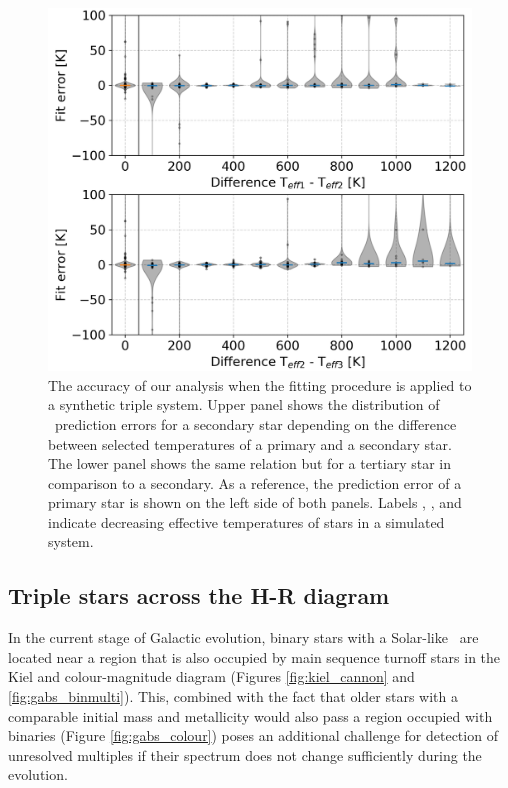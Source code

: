 \begin{figure}
	\centering
	\includegraphics[width=\columnwidth]{three_stars_fit_sim_res.png}
	\caption{The accuracy of our analysis when the fitting procedure is applied to a synthetic triple system. Upper panel shows the distribution of \Teff\ prediction errors for a secondary star depending on the difference between selected temperatures of a primary and a secondary star. The lower panel shows the same relation but for a tertiary star in comparison to a secondary. As a reference, the prediction error of a primary star is shown on the left side of both panels. Labels , , and  indicate decreasing effective temperatures of stars in a simulated system.}
	\label{fig:triple_sym_res}
\end{figure}

\subsection{Triple stars across the H-R diagram}
In the current stage of Galactic evolution, binary stars with a Solar-like \Teff\ are located near a region that is also occupied by main sequence turnoff stars in the Kiel and colour-magnitude diagram (Figures \ref{fig:kiel_cannon} and \ref{fig:gabs_binmulti}). This, combined with the fact that older stars with a comparable initial mass and metallicity would also pass a region occupied with binaries (Figure \ref{fig:gabs_colour}) poses an additional challenge for detection of unresolved multiples if their spectrum does not change sufficiently during the evolution.


